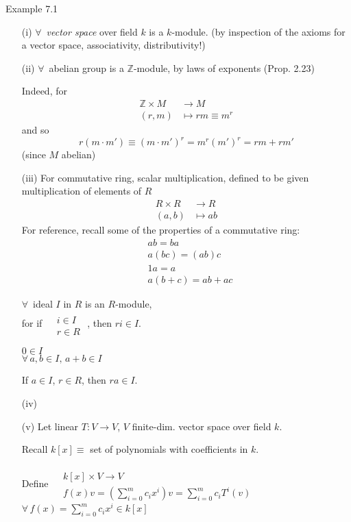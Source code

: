 \documentclass[10pt]{amsart}
\begin{document}
\begin{multicols*}{2}
Example 7.1 \begin{enumerate}
	\item[(i)] $\forall \, $ \emph{vector space} over field $k$ is a $k$-module.  (by inspection of the axioms for a vector space, associativity, distributivity!)
	\item[(ii)] $\forall \, $ abelian group is a $\mathbb{Z}$-module, by laws of exponents (Prop. 2.23)
	
	Indeed, for
	\[
	\begin{aligned}
	\mathbb{Z} \times M & \to M \\ 
	(r,m) & \mapsto rm \equiv m^r 
	\end{aligned}
	\]
	and so
	\[
	r(m\cdot m') \equiv (m\cdot m')^r = m^r (m')^r = rm + rm' 
	\]
	(since $M$ abelian)
	\item[(iii)] For commutative ring, scalar multiplication, defined to be given multiplication of elements of $R$
	\[
	\begin{aligned}
	R\times R & \to R \\
	(a,b) & \mapsto ab 
	\end{aligned}
	\]
	For reference, recall some of the properties of a commutative ring:
	\[
	\begin{aligned}
	& ab = ba \\ 
	& a(bc) = (ab)c \\ 
	& 1a = a \\ 
	& a(b+c) = ab + ac
	\end{aligned}
	\]
	
	$\forall \, $ ideal $I$ in $R$ is an $R$-module, \\
	for if $\begin{aligned} & \quad \\
	& i \in I \\
	& r\in R \end{aligned}$ , then $ri \in I$.
	
	$0\in I$ \\
	$\forall \, a,b \in I, \, a+b \in I$
	
	
	If $a\in I$, $r\in R$, then $ra \in I$.
	
	
	\item[(iv)]
	\item[(v)] Let linear $T:V \to V$, $V$ finite-dim. vector space over field $k$.  
	
	Recall $k[x] \equiv $ set of polynomials with coefficients in $k$.  
	
	Define $\begin{aligned} & \quad \\
	& k[x] \times V \to V \\
	& f(x)v =\left(\sum_{i=0}^m c_i x^i\right)v =\sum_{i=0}^m c_iT^i(v) \end{aligned}$ \quad \, $\forall \, f(x) = \sum_{i=0}^m c_ix^i \in k[x]$
	

\end{enumerate}
\end{multicols*}
\end{document}
